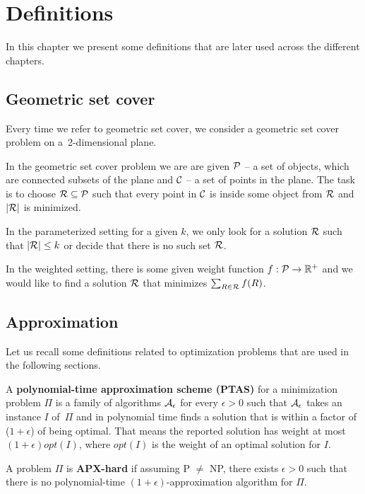 \chapter{Definitions}

In this chapter we present some definitions that are later used
across the different chapters.

\section{Geometric set cover}
Every time we refer to geometric set cover,
we consider a geometric set cover problem
on a~2-dimensional plane.

In the geometric set cover problem we are are given
$\mathcal{P}$ -- a set of objects, which are connected
subsets of the plane and $\mathcal{C}$ -- a set of points in the plane.
The task is to choose $\mathcal{R} \subseteq \mathcal{P}$ such that
every point in $\mathcal{C}$ is inside some object from $\mathcal{R}$
and $|\mathcal{R}|$ is minimized.

In the parameterized setting for a given $k$,
we only look for a solution $\mathcal{R}$ such that $|\mathcal{R}| \le k$
or decide that there is no such set $\mathcal{R}$.

In the weighted setting, there is some given weight function
$f : \mathcal{P} \rightarrow \mathbb{R^+}$
and we would like to find a solution $\mathcal{R}$
that minimizes $\sum_{R \in \mathcal{R}} f(R)$.

\section{Approximation}

Let us recall some definitions related to optimization problems
that are used in the following sections.

\begin{defi}
A \textbf{polynomial-time approximation scheme (PTAS)}
for a minimization problem $\Pi$
is a family of algorithms $\cal{A}_\epsilon$ for
every $\epsilon > 0$
such that $\cal{A}_\epsilon$ takes an instance $I$ of~$\Pi$
and in polynomial time
finds a solution that is within a factor
of ($1+\epsilon$) of being optimal.
That means the reported solution has weight at most
$(1+\epsilon)opt(I)$, where $opt(I)$ is the weight
of an optimal solution for $I$.
\end{defi}

\begin{defi}
A problem $\Pi$ is \textbf{APX-hard} if assuming P $\neq$ NP,
there exists $\epsilon > 0$
such that there is no polynomial-time $(1+\epsilon)$-approximation algorithm
for $\Pi$.
\end{defi}

